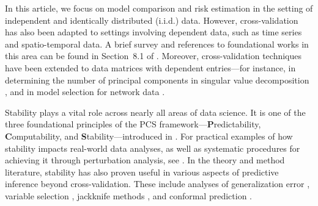 \documentclass[11pt]{article}
\theoremstyle{plain}
\begin{document}
In this article, we focus on model comparison and risk estimation in the setting of independent and identically distributed (i.i.d.) data. However, cross-validation has also been adapted to settings involving dependent data, such as time series and spatio-temporal data. A brief survey and references to foundational works in this area can be found in Section~8.1 of \cite{arlot2010survey}. Moreover, cross-validation techniques have been extended to data matrices with dependent entries---for instance, in determining the number of principal components in singular value decomposition \citep{owen2009bi,hoff2007modeling}, and in model selection for network data \citep{chen2018network,li2020network,qin2022consistent}.

Stability plays a vital role across nearly all areas of data science. It is one of the three foundational principles of the PCS framework---\textbf{P}redictability, \textbf{C}omputability, and \textbf{S}tability---introduced in \citet{yu2020veridical}. For practical examples of how stability impacts real-world data analyses, as well as systematic procedures for achieving it through perturbation analysis, see \citet{yu2024veridical}. In the theory and method literature, stability has also proven useful in various aspects of predictive inference beyond cross-validation. These include analyses of generalization error \citep{buhlmann2002analyzing,shalev2010learnability,wang2016learning}, variable selection \citep{meinshausen2010stability,liu2010stability}, jackknife methods \citep{barber2021predictive,steinberger2023conditional}, and conformal prediction \citep{lei2018distribution,angelopoulos2024theoretical}.

\end{document}
